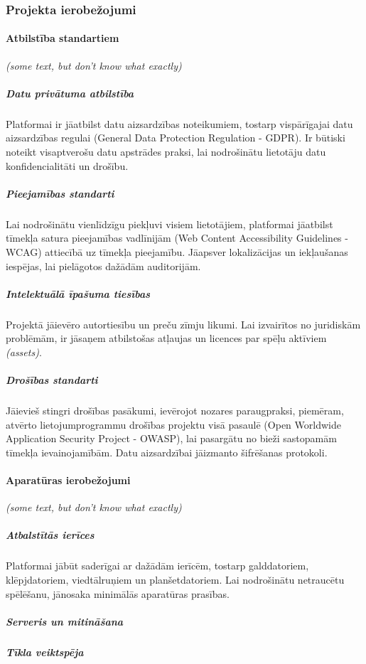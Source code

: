 \subsubsection{Projekta ierobežojumi}
\paragraph{Atbilstība standartiem}
\textit{(some text, but don't know what exactly)}

\subparagraph{Datu privātuma atbilstība}
Platformai ir jāatbilst datu aizsardzības noteikumiem, tostarp vispārīgajai datu aizsardzības regulai (General Data Protection Regulation - GDPR).
Ir būtiski noteikt visaptverošu datu apstrādes praksi, lai nodrošinātu lietotāju datu konfidencialitāti un drošību.

\subparagraph{Pieejamības standarti}
Lai nodrošinātu vienlīdzīgu piekļuvi visiem lietotājiem, platformai jāatbilst tīmekļa satura pieejamības vadlīnijām (Web Content Accessibility Guidelines - WCAG) attiecībā uz tīmekļa pieejamību.
Jāapsver lokalizācijas un iekļaušanas iespējas, lai pielāgotos dažādām auditorijām.

\subparagraph{Intelektuālā īpašuma tiesības}
Projektā jāievēro autortiesību un preču zīmju likumi.
Lai izvairītos no juridiskām problēmām, ir jāsaņem atbilstošas atļaujas un licences par spēļu aktīviem \textit{(assets)}.

\subparagraph{Drošības standarti}
Jāievieš stingri drošības pasākumi, ievērojot nozares paraugpraksi, piemēram, atvērto lietojumprogrammu drošības projektu visā pasaulē (Open Worldwide Application Security Project - OWASP), lai pasargātu no bieži sastopamām tīmekļa ievainojamībām.
Datu aizsardzībai jāizmanto šifrēšanas protokoli.

\paragraph{Aparatūras ierobežojumi}
\textit{(some text, but don't know what exactly)}

\subparagraph{Atbalstītās ierīces}
Platformai jābūt saderīgai ar dažādām ierīcēm, tostarp galddatoriem, klēpjdatoriem, viedtālruņiem un planšetdatoriem.
Lai nodrošinātu netraucētu spēlēšanu, jānosaka minimālās aparatūras prasības.

\subparagraph{Serveris un mitināšana}

\subparagraph{Tīkla veiktspēja}
